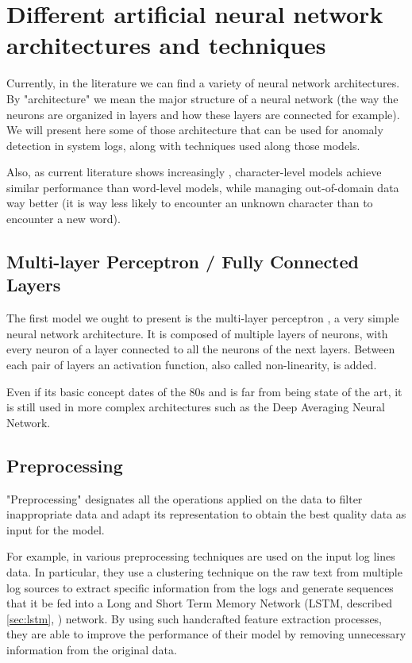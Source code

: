 \chapter{Different artificial neural network architectures and techniques}

Currently, in the literature we can find a variety of neural network architectures. By "architecture" we mean the major structure of a neural network (the way the neurons are organized in layers and how these layers are connected for example). We will present here some of those architecture that can be used for anomaly detection in system logs, along with techniques used along those models.

Also, as current literature shows increasingly \cite{rnn_attention_lanl}, character-level models achieve similar performance than word-level models, while managing out-of-domain data way better (it is way less likely to encounter an unknown character than to encounter a new word).

\section{Multi-layer Perceptron / Fully Connected Layers}
The first model we ought to present is the multi-layer perceptron \cite{deep_learning_book}, a very simple neural network architecture.
It is composed of multiple layers of neurons, with every neuron of a layer connected to all the neurons of the next layers. Between each pair of layers an activation function, also called non-linearity, is added.

Even if its basic concept dates of the 80s \cite{mlp} and is far from being state of the art, it is still used in more complex architectures such as the Deep Averaging Neural Network.

\section{Preprocessing\label{sec:preprocess}}
"Preprocessing" designates all the operations applied on the data to filter inappropriate data and adapt its representation to obtain the best quality data as input for the model.

For example, in \cite{lstm_cluster} various preprocessing techniques are used on the input log lines data. In particular, they use a clustering technique on the raw text from multiple log sources to extract specific information from the logs and generate sequences that it be fed into a Long and Short Term Memory Network (LSTM, described \autoref{sec:lstm}, ) network. By using such handcrafted feature extraction processes, they are able to improve the performance of their model by removing unnecessary information from the original data.


